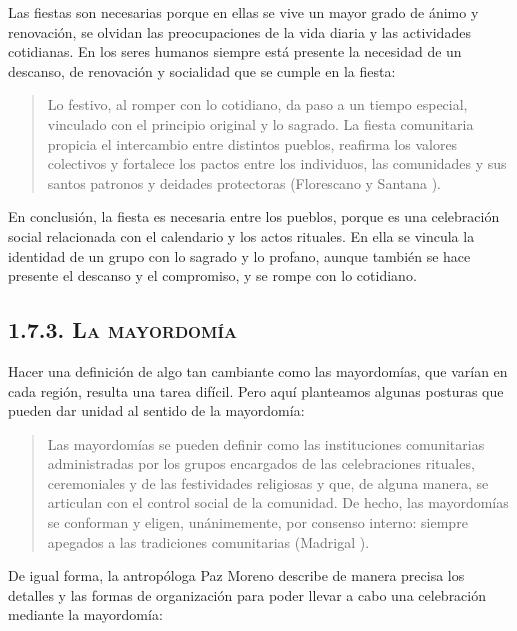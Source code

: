 \documentclass[14pt,letterpaper,twoside]{extbook} %
\begin{document}
\noindent Las fiestas son necesarias porque en ellas se vive un mayor grado de ánimo y renovación, se olvidan las preocupaciones de la vida diaria y las actividades cotidianas. En los seres humanos siempre está presente la necesidad de un descanso, de renovación y socialidad que se
cumple en la fiesta:

\begin{quotation}
\noindent Lo festivo, al romper con lo cotidiano, da paso a un tiempo especial, vinculado con el principio original y lo sagrado. La fiesta comunitaria propicia el intercambio entre distintos pueblos, reafirma los valores colectivos y fortalece los pactos entre los individuos, las comunidades y sus santos patronos y deidades protectoras (Florescano y Santana ).
\end{quotation}

\noindent En conclusión, la fiesta es necesaria entre los pueblos, porque es una celebración social relacionada con el calendario y los actos rituales. En ella se vincula la identidad de un grupo con lo sagrado y lo profano, aunque también se hace presente el descanso y el compromiso, y se rompe con lo cotidiano.

\subsection*{\mdseries\large\textsc{1.7.3. La mayordomía}}

\noindent Hacer una definición de algo tan cambiante como las mayordomías, que varían en cada región, resulta una tarea difícil. Pero aquí planteamos algunas posturas que pueden dar unidad al sentido de la mayordomía:

\begin{quotation}
\noindent Las mayordomías se pueden definir como las instituciones comunitarias administradas por los grupos encargados de las celebraciones rituales, ceremoniales y de las festividades religiosas y que, de alguna manera, se articulan con el control social de la comunidad. De hecho, las mayordomías se conforman y eligen, unánimemente, por consenso interno: siempre apegados a las tradiciones comunitarias (Madrigal ).
\end{quotation}

\noindent De igual forma, la antropóloga Paz Moreno describe de manera precisa los detalles y las formas de organización para poder llevar a cabo una celebración mediante la mayordomía:
\end{document}
